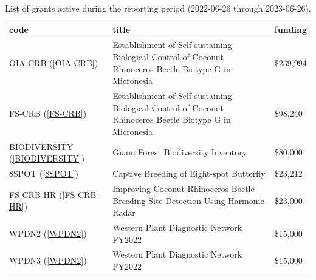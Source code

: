 \begin{table}[h!]
	\centering
	\caption{List of grants active during the reporting period (2022-06-26 through 2023-06-26).}
	\label{grantlist}
	\begin{tabular}{lp{3in}>{\raggedleft\arraybackslash}l}
		\toprule
		code &                                                                                                    title &  funding \\
		\midrule
		OIA-CRB (\ref{OIA-CRB}) & Establishment of Self-sustaining Biological Control of Coconut Rhinoceros Beetle Biotype G in Micronesia & \$239,994 \\
		\midrule
		FS-CRB (\ref{FS-CRB})& Establishment of Self-sustaining Biological Control of Coconut Rhinoceros Beetle Biotype G in Micronesia &  \$98,240 \\
		\midrule
		BIODIVERSITY (\ref{BIODIVERSITY}) &                                                                       Guam Forest Biodiversity Inventory &  \$80,000 \\
		\midrule		
		8SPOT (\ref{8SPOT}) &                                                                 Captive Breeding of Eight-spot Butterfly &  \$23,212 \\
		\midrule
		FS-CRB-HR (\ref{FS-CRB-HR})&                         Improving Coconut Rhinoceros Beetle Breeding Site Detection Using Harmonic Radar &  \$23,000 \\
		\midrule
		WPDN2 (\ref{WPDN2}) &                                                                  Western Plant Diagnostic Network FY2022 &  \$15,000 \\
		\midrule
		WPDN3 (\ref{WPDN2}) &                                                                  Western Plant Diagnostic Network FY2022 &  \$15,000 \\
		\bottomrule
	\end{tabular}
\end{table}


